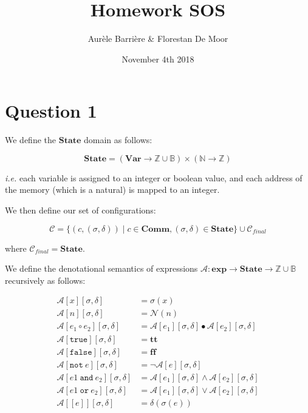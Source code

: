 \documentclass{article}
\title{Homework SOS}
\author{Aur\`ele Barri\`ere \& Florestan De Moor}
\date{November 4th 2018}
\newcommand{\var}{\mathbf{Var}}
\newcommand{\state}{\mathbf{State}}
\newcommand{\comm}{\mathbf{Comm}}
\newcommand{\A}{\mathcal{A}}
\newcommand{\C}{\mathcal{C}}
\newcommand{\Aa}[2]{\mathcal{A}\left[#1\right]\left[#2\right]}
\newcommand{\N}{\mathcal{N}}
\newcommand{\true}{\mathbf{tt}}
\newcommand{\false}{\mathbf{ff}}
\newcommand{\expr}{\mathbf{exp}}
\newcommand{\ie}{\emph{i.e.}}
\begin{document}
\maketitle

\section*{Question 1}


We define the $\state{}$ domain as follows:

\[
\state{} = \left(\var{}  \longrightarrow \mathbb{Z} \cup \mathbb{B} \right) \times \left( \mathbb{N} \longrightarrow \mathbb{Z} \right)
\]

\ie{} each variable is assigned to an integer or boolean  value, and each address of the memory (which is a natural) is mapped to an integer.

We then define our set of configurations:

\[
\C = \lbrace \left( c, (\sigma, \delta) \right) \mid c \in \comm{}, (\sigma, \delta) \in \state{} \rbrace \cup \C_{final}
\]

where $\C_{final} = \state{}$.

We define the denotational semantics of expressions $\A{}: \expr{} \longrightarrow \state{} \longrightarrow \mathbb{Z} \cup \mathbb{B}$ recursively as follows:

\begin{align*}
	\Aa{x}{\sigma, \delta} &= \sigma(x) \\
	\Aa{n}{\sigma, \delta} &= \N(n) \\
	\Aa{e_1 \circ e_2}{\sigma, \delta} &= \Aa{e_1}{\sigma, \delta} \bullet \Aa{e_2}{\sigma, \delta} \\
	\Aa{\texttt{true}}{\sigma, \delta} &= \true{} \\
	\Aa{\texttt{false}}{\sigma, \delta} &= \false{} \\
	\Aa{\texttt{not}~e}{\sigma, \delta} &= \neg \Aa{e}{\sigma, \delta} \\
	\Aa{e1~\texttt{and}~e_2}{\sigma, \delta} &= \Aa{e_1}{\sigma, \delta} \wedge \Aa{e_2}{\sigma, \delta} \\
	\Aa{e1~\texttt{or}~e_2}{\sigma, \delta} &= \Aa{e_1}{\sigma, \delta} \vee \Aa{e_2}{\sigma, \delta} \\
	\Aa{[e]}{\sigma, \delta} &= \delta(\sigma(e)) \\
\end{align*}
\end{document}
